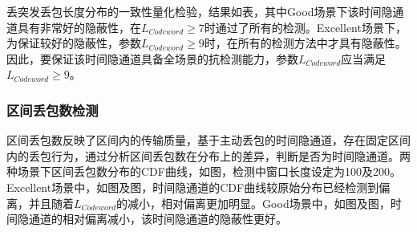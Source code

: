 
丢突发丢包长度分布的一致性量化检验，结果如表，其中Good场景下该时间隐通道具有非常好的隐蔽性，在$L_{Codeword}\ge 7$时通过了所有的检测。Excellent场景下，为保证较好的隐蔽性，参数$L_{Codeword}\ge 9$时，在所有的检测方法中才具有隐蔽性。因此，要保证该时间隐通道具备全场景的抗检测能力，参数$L_{Codeword}$应当满足$L_{Codeword}\ge 9$。

\subsubsection{区间丢包数检测}
\label{chap:hash:result:undetectability:plr}

区间丢包数反映了区间内的传输质量，基于主动丢包的时间隐通道，存在固定区间内的丢包行为，通过分析区间丢包数在分布上的差异，判断是否为时间隐通道。两种场景下区间丢包数分布的CDF曲线，如图，检测中窗口长度设定为100及200。Excellent场景中，如图及图，时间隐通道的CDF曲线较原始分布已经检测到偏离，并且随着$L_{Codeword}$的减小，相对偏离更加明显。Good场景中，如图及图，时间隐通道的相对偏离减小，该时间隐通道的隐蔽性更好。

